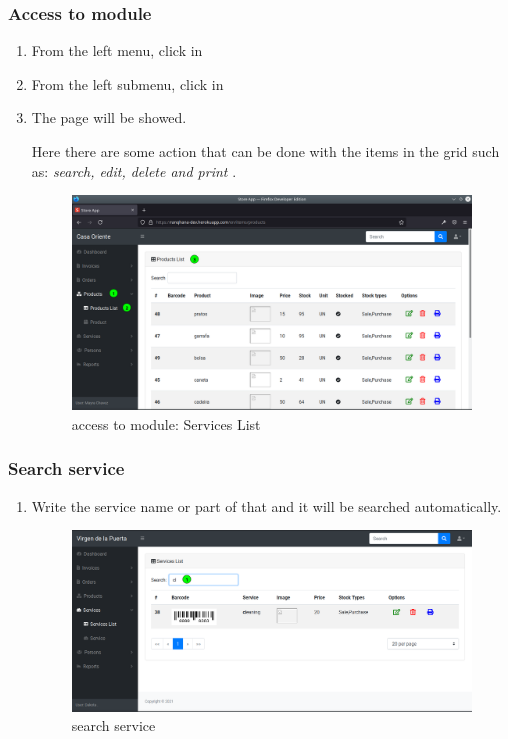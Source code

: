 \documentclass[a4paper,11pt]{refart}
\begin{document}
\subsubsection{Access to module}
\begin{enumerate}
	\item From the left menu, click in  
	\item From the left submenu, click in  
	\item The page will be showed.
	\medskip
	\begin{leftbar}
		Here there are some action that can be done with the items in the grid such as: \emph{search, edit, delete and print} .
	\end{leftbar}
	\begin{figure}[H]\centering
		\includegraphics[width=\textwidth]{images/produc_list-access.png}
		\caption{access to module: Services List}
		\label{fig:service_list-access.png}
	\end{figure}
\end{enumerate}

\subsubsection{Search service}\label{section:service_search}
\begin{enumerate}
	\item Write the service name or part of that and it will be searched automatically.
	\begin{figure}[H]\centering
		\includegraphics[width=\textwidth]{images/service_list-search.png}
		\caption{search service}
		\label{fig:service_list-search.png}
	\end{figure}
\end{enumerate}
\end{document}
